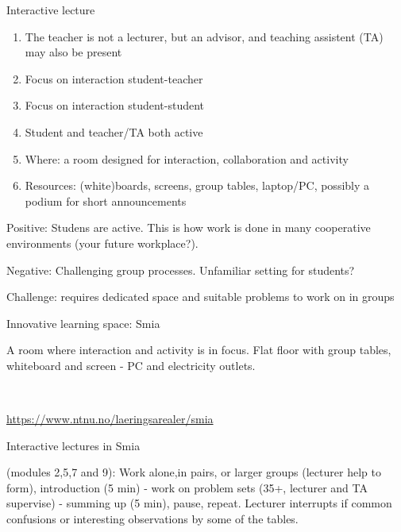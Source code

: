 \documentclass[10pt,ignorenonframetext,]{beamer}
\providecommand{\tightlist}{%
  \setlength{\itemsep}{0pt}\setlength{\parskip}{0pt}}
\begin{document}
\begin{frame}

\begin{block}{Interactive lecture}

\begin{enumerate}
\def\labelenumi{\arabic{enumi})}
\tightlist
\item
  The teacher is not a lecturer, but an advisor, and teaching assistent
  (TA) may also be present
\item
  Focus on interaction student-teacher
\item
  Focus on interaction student-student
\item
  Student and teacher/TA both active
\item
  Where: a room designed for interaction, collaboration and activity
\item
  Resources: (white)boards, screens, group tables, laptop/PC, possibly a
  podium for short announcements
\end{enumerate}

Positive: Studens are active. This is how work is done in many
cooperative environments (your future workplace?).

Negative: Challenging group processes. Unfamiliar setting for students?

Challenge: requires dedicated space and suitable problems to work on in
groups

\end{block}

\end{frame}

\begin{frame}

\begin{block}{Innovative learning space: Smia}

A room where interaction and activity is in focus. Flat floor with group
tables, whiteboard and screen - PC and electricity outlets.

~

\url{https://www.ntnu.no/laeringsarealer/smia}

\end{block}

\end{frame}

\begin{frame}

\begin{block}{Interactive lectures in Smia}

(modules 2,5,7 and 9): Work alone,in pairs, or larger groups (lecturer
help to form), introduction (5 min) - work on problem sets (35+,
lecturer and TA supervise) - summing up (5 min), pause, repeat. Lecturer
interrupts if common confusions or interesting observations by some of
the tables.

\end{block}

\end{frame}
\end{document}
